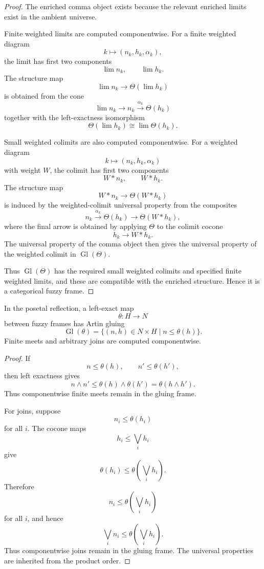 \begin{proof}
The enriched comma object exists because the relevant enriched limits exist in
the ambient universe.

Finite weighted limits are computed componentwise.  For a finite weighted
diagram
\[
    k\longmapsto (n_k,h_k,\alpha_k),
\]
the limit has first two components
\[
    \lim n_k,
    \qquad
    \lim h_k.
\]
The structure map
\[
    \lim n_k\to \Theta(\lim h_k)
\]
is obtained from the cone
\[
    \lim n_k\to n_k\xrightarrow{\alpha_k}\Theta(h_k)
\]
together with the left-exactness isomorphism
\[
    \Theta(\lim h_k)\cong\lim\Theta(h_k).
\]

Small weighted colimits are also computed componentwise.  For a weighted
diagram
\[
    k\longmapsto(n_k,h_k,\alpha_k)
\]
with weight \(W\), the colimit has first two components
\[
    W*n_k,
    \qquad
    W*h_k.
\]
The structure map
\[
    W*n_k\to\Theta(W*h_k)
\]
is induced by the weighted-colimit universal property from the composites
\[
    n_k
    \xrightarrow{\alpha_k}
    \Theta(h_k)
    \longrightarrow
    \Theta(W*h_k),
\]
where the final arrow is obtained by applying \(\Theta\) to the colimit cocone
\[
    h_k\to W*h_k.
\]
The universal property of the comma object then gives the universal property
of the weighted colimit in \(\operatorname{Gl}(\Theta)\).

Thus \(\operatorname{Gl}(\Theta)\) has the required small weighted colimits and
specified finite weighted limits, and these are compatible with the enriched
structure.  Hence it is a categorical fuzzy frame.
\end{proof}

\begin{proposition}
\label{prop:posetal-artin-gluing}
In the posetal reflection, a left-exact map
\[
    \theta:H\to N
\]
between fuzzy frames has Artin gluing
\[
    \operatorname{Gl}(\theta)
    =
    \{(n,h)\in N\times H\mid n\leq\theta(h)\}.
\]
Finite meets and arbitrary joins are computed componentwise.
\end{proposition}

\begin{proof}
If
\[
    n\leq\theta(h),
    \qquad
    n'\leq\theta(h'),
\]
then left exactness gives
\[
    n\wedge n'
    \leq
    \theta(h)\wedge\theta(h')
    =
    \theta(h\wedge h').
\]
Thus componentwise finite meets remain in the gluing frame.

For joins, suppose
\[
    n_i\leq\theta(h_i)
\]
for all \(i\).  The cocone maps
\[
    h_i\leq\bigvee_i h_i
\]
give
\[
    \theta(h_i)\leq\theta\left(\bigvee_i h_i\right).
\]
Therefore
\[
    n_i\leq\theta\left(\bigvee_i h_i\right)
\]
for all \(i\), and hence
\[
    \bigvee_i n_i
    \leq
    \theta\left(\bigvee_i h_i\right).
\]
Thus componentwise joins remain in the gluing frame.  The universal properties
are inherited from the product order.
\end{proof}

